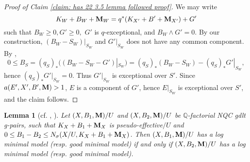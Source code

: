\documentclass[11pt]{amsart}
\numberwithin{equation}{section}
\newcommand{\Mm}{{\bf{M}}}
\newcommand{\Qq}{\mathbb{Q}}
\newtheorem{lem}[thm]{Lemma}
\theoremstyle{definition}
\theoremstyle{definition}
\theoremstyle{definition}
\begin{document}
\begin{proof}[Proof of Claim \ref{claim: has 22 3.5 lemma followed proof}]
We may write 
$$K_W+B_W+\Mm_W=q^*(K_{X'}+B'+\Mm_{X'})+G'$$
such that $B_W\geq 0, G'\geq 0,$ $G'$ is $q$-exceptional, and $B_W\wedge G'=0$. By our construction, $(B_W-S_W)|_{S_W}$ and $G'|_{S_W}$ does not have any common component. By \cite[Definition 4.7]{BZ16}, $$0\leq B_S=(q_S)_*((B_W-S_W-G')|_{S_W})=(q_S)_*(B_W-S_W)-(q_S)_*G'|_{S_W},$$
hence $(q_S)_*G'|_{S_W}=0$. Thus $G'|_{S_W}$ is exceptional over $S'$.  Since $a(E',X',B',\Mm)>1$, $E$ is a component of $G'$, hence $E|_{S_W}$ is exceptional over $S'$, and the claim follows.
\end{proof}

\begin{lem}[{cf. \cite[Lemma 3.6]{Has22}, \cite[Lemma 5.3]{HMX18}}]\label{lem: has22 3.6 rel gdlt} Let $(X,B_1,\Mm)/U$ and $(X,B_2,\Mm)/U$ be $\Qq$-factorial NQC gdlt g-pairs, such that $K_X+B_1+\Mm_X$ is pseudo-effective$/U$ and $0\leq B_1-B_2\leq N_{\sigma}(X/U,K_X+B_1+\Mm_X)$. Then $(X,B_1,\Mm)/U$ has a log minimal model (resp. good minimal model) if and only if $(X,B_2,\Mm)/U$ has a log minimal model (resp. good minimal model).  
\end{lem}
\end{document}
